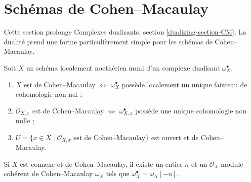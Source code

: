 \section{Schémas de Cohen--Macaulay}
\label{section-CM}

\noindent
Cette section prolonge Complexes dualisants, section \ref{dualizing-section-CM}. La dualité prend une forme particulièrement simple pour les schémas de Cohen–Macaulay.

\begin{lemma}
\label{lemma-dualizing-module-CM-scheme}
Soit $X$ un schéma localement noethérien muni d'un complexe dualisant $\omega_X^\bullet$.
\begin{enumerate}
\item $X$ est de Cohen–Macaulay $\Leftrightarrow$ $\omega_X^\bullet$ possède localement un unique faisceau de cohomologie non nul ;
\item $\mathcal{O}_{X, x}$ est de Cohen–Macaulay $\Leftrightarrow$ $\omega_{X, x}^\bullet$ possède une unique cohomologie non nulle ;
\item $U = \{x \in X \mid \mathcal{O}_{X, x}\text{ est de Cohen--Macaulay}\}$ est ouvert et de Cohen–Macaulay.
\end{enumerate}
Si $X$ est connexe et de Cohen–Macaulay, il existe un entier $n$ et un $\mathcal{O}_X$-module cohérent de Cohen–Macaulay $\omega_X$ tels que $\omega_X^\bullet = \omega_X[-n]$.
\end{lemma}

